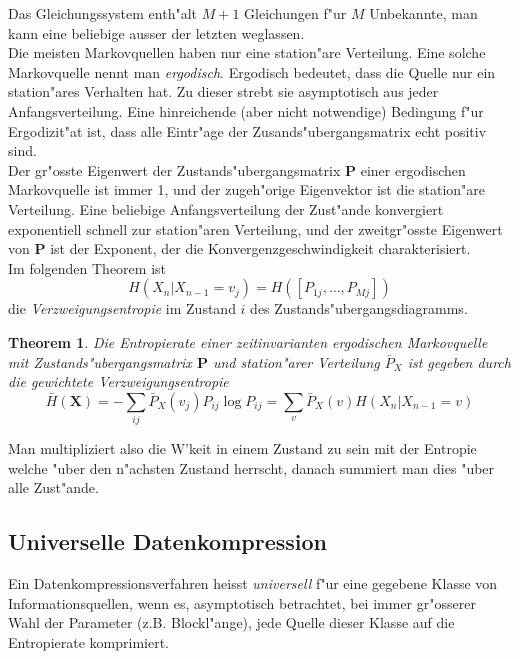\documentclass[german, 10pt, a4paper, twocolumn]{scrartcl}
\newtheorem{theorem}{Theorem}
\begin{document}
Das Gleichungssystem enth"alt $M+1$ Gleichungen f"ur $M$ Unbekannte, man kann eine beliebige ausser der letzten weglassen.\\

Die meisten Markovquellen haben nur eine station"are Verteilung. Eine solche Markovquelle nennt man \textit{ergodisch}. Ergodisch bedeutet, dass die Quelle nur ein station"ares Verhalten hat. Zu dieser strebt sie asymptotisch aus jeder Anfangsverteilung. Eine hinreichende (aber nicht notwendige) Bedingung f"ur Ergodizit"at ist, dass alle Eintr"age der Zusands"ubergangsmatrix echt positiv sind.\\

Der gr"osste Eigenwert der Zustands"ubergangsmatrix $\mathbf{P}$ einer ergodischen Markovquelle ist immer 1, und der zugeh"orige Eigenvektor ist die station"are Verteilung. Eine beliebige Anfangsverteilung der Zust"ande konvergiert exponentiell schnell zur station"aren Verteilung, und der zweitgr"osste Eigenwert von $\mathbf{P}$ ist der Exponent, der die Konvergenzgeschwindigkeit charakterisiert.\\

Im folgenden Theorem ist
\begin{displaymath}
	H(X_n|X_{n-1}=v_j)= H([P_{1j},\ldots,P_{Mj}])
\end{displaymath}
die \textit{Verzweigungsentropie} im Zustand $i$ des Zustands"ubergangsdiagramms.

\begin{theorem}
	Die Entropierate einer zeitinvarianten ergodischen Markovquelle mit Zustands"ubergangsmatrix $\mathbf{P}$ und station"arer Verteilung $\bar{P}_X$ ist gegeben durch die gewichtete Verzweigungsentropie
	\begin{displaymath}
		\bar{H}(\mathbf{X})=-\sum_{ij}\bar{P}_X(v_j)P_{ij}\log P_{ij}=\sum_v\bar{P}_X(v)H(X_n|X_{n-1}=v)
	\end{displaymath}
\end{theorem}

Man multipliziert also die W'keit in einem Zustand zu sein mit der Entropie welche "uber den n"achsten Zustand herrscht, danach summiert man dies "uber alle Zust"ande.

\subsection{Universelle Datenkompression}

Ein Datenkompressionsverfahren heisst \textit{universell} f"ur eine gegebene Klasse von Informationsquellen, wenn es, asymptotisch betrachtet, bei immer gr"osserer Wahl der Parameter (z.B. Blockl"ange), jede Quelle dieser Klasse auf die Entropierate komprimiert.
\end{document}
